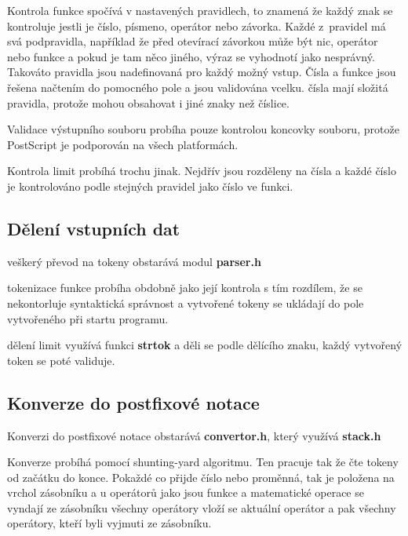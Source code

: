 \documentclass[../main.tex]{subfiles}
\begin{document}
Kontrola funkce spočívá v nastavených pravidlech, to znamená že každý znak se kontroluje jestli je číslo, písmeno, operátor nebo závorka. Každé z~pravidel má svá podpravidla, například že před otevírací závorkou může být nic, operátor nebo funkce a pokud je tam něco jiného, výraz se vyhodnotí jako nesprávný. Takováto pravidla jsou nadefinovaná pro každý možný vstup. Čísla a funkce jsou řešena načtením do pomocného pole a jsou validována vcelku. čísla mají složitá pravidla, protože mohou obsahovat i jiné znaky než číslice.
\vspace{0.5em}

Validace výstupního souboru probíha pouze kontrolou koncovky souboru, protože PostScript je podporován na všech platformách.
\vspace{0.5em}

\hfill Kontrola limit probíhá trochu jinak. Nejdřív jsou rozděleny na čísla \newline a každé číslo je kontrolováno podle stejných pravidel jako číslo ve funkci.

\subsection{Dělení vstupních dat}
veškerý převod na tokeny obstarává modul \textbf{parser.h}
\vspace{0.5em}

tokenizace funkce probíha obdobně jako její kontrola s tím rozdílem, že se nekontorluje syntaktická správnost a vytvořené tokeny se ukládají do pole vytvořeného při startu programu.
\vspace{0.5em}

dělení limit využívá funkci \textbf{strtok} a děli se podle dělícího znaku, každý vytvořený token se poté validuje.

\subsection{Konverze do postfixové notace}
Konverzi do postfixové notace obstarává \textbf{convertor.h}, který využívá \textbf{stack.h}
\vspace{0.5em}

Konverze probíhá pomocí shunting-yard algoritmu. Ten pracuje tak že čte tokeny od začátku do konce. Pokaždé co přijde číslo nebo proměnná, tak je položena na vrchol zásobníku a u operátorů jako jsou funkce a matematické operace se vyndají ze zásobníku všechny operátory vloží se aktuální operátor a pak všechny operátory, kteří byli vyjmuti ze zásobníku.
\end{document}
